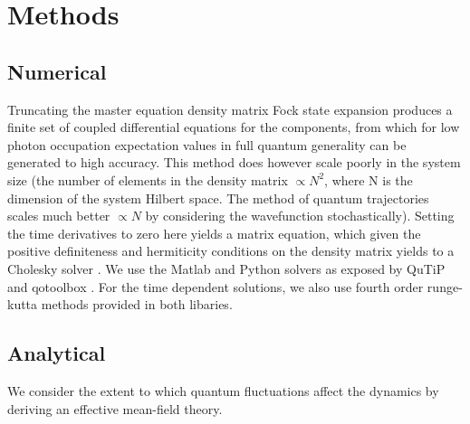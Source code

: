 \appendix
\section{Methods}
\subsection{Numerical}
Truncating the master equation density matrix Fock state expansion produces a finite set of coupled differential equations for the components, from which for low photon occupation expectation values in full quantum generality can be generated to high accuracy.
This method does however scale poorly in the system size (the number of elements in the density matrix $\propto N^2$, where N is the dimension of the system Hilbert space.
The method of quantum trajectories scales much better \cite{Molmer1993} $\propto N$ by considering the wavefunction stochastically).
Setting the time derivatives to zero here yields a matrix equation, which given the positive definiteness and hermiticity conditions on the density matrix yields to a Cholesky solver \cite{Press1992}.
We use the Matlab and Python solvers as exposed by QuTiP \cite{Johansson2013a} and qotoolbox \cite{Tan}. For the time dependent solutions, we also use fourth order runge-kutta methods provided in both libaries.
\subsection{Analytical}
We consider the extent to which quantum fluctuations affect the dynamics by deriving an effective mean-field theory.

